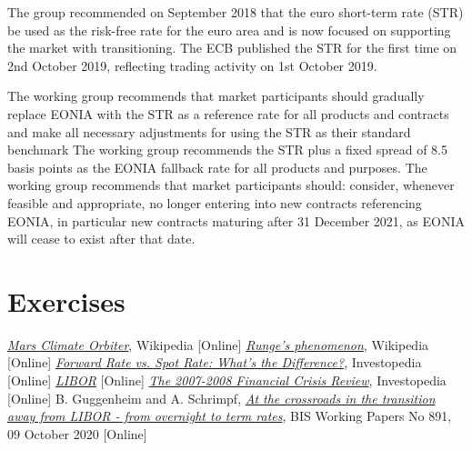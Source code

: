 The group recommended on September 2018 that the euro short-term rate (STR) be used as the risk-free rate for the euro area and is now focused on supporting the market with transitioning.
The ECB published the STR for the first time on 2nd October 2019, reflecting trading activity on 1st October 2019.

The working group recommends that market participants should gradually replace EONIA with the STR as a reference rate for all products and contracts and make all necessary adjustments for using the STR as their standard benchmark The working group recommends the STR plus a fixed spread of 8.5
basis points as the EONIA fallback rate for all products and purposes. The working group recommends that market participants should: consider, whenever feasible and appropriate, no longer entering into new contracts referencing EONIA, in particular new contracts maturing after 31 December 2021, as EONIA will cease to exist after that date.


\section{Exercises}


\begin{thebibliography}{9}
	\href{https://en.wikipedia.org/wiki/Mars_Climate_Orbiter}{\emph{Mars Climate Orbiter}}, Wikipedia [Online]
	 \href{https://en.wikipedia.org/wiki/Runge\%27s_phenomenon}{\emph{Runge's phenomenon}}, Wikipedia [Online]
	\href{https://www.investopedia.com/ask/answers/042315/what-difference-between-forward-rate-and-spot-rate.asp}{\emph{Forward Rate vs. Spot Rate: What's the Difference?}}, Investopedia [Online]
	 \href{https://www.ig.com/it/glossario-trading/definizione-di-libor}{\emph{LIBOR}} [Online]
	 \href{https://www.investopedia.com/articles/economics/09/financial-crisis-review.asp}{\emph{The 2007-2008 Financial Crisis Review}}, Investopedia [Online]
	B. Guggenheim and A. Schrimpf, 
	\href{https://www.bis.org/publ/work891.htm}{\emph{At the crossroads in the transition away from LIBOR - from overnight to term rates}}, BIS Working Papers No 891, 09 October 2020 [Online]
\end{thebibliography}
